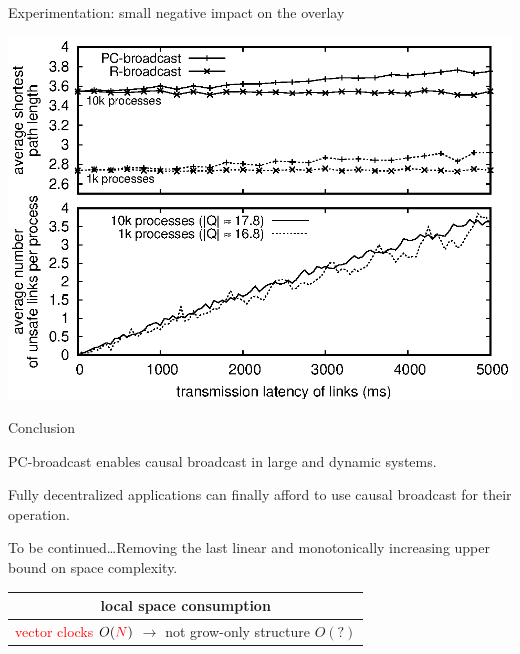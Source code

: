 \documentclass[10pt, xcolor={usenames, dvipsnames}]{beamer}
\newcommand{\NO}[1]{\textcolor{red}{#1}}
\begin{document}
\begin{frame}{Experimentation: small negative impact on the overlay}

  \begin{center}
    \includegraphics[width=1\textwidth]{img/delay.eps}
  \end{center}

\end{frame}

\begin{frame}{Conclusion}
  
  PC-broadcast enables causal broadcast in large and dynamic systems. 
  
  \vspace{1em}

  Fully decentralized applications can finally afford to use causal broadcast
  for their operation. 


  \begin{table}
    
  \end{table}


\end{frame}

\begin{frame}[standout]
  To be continued\ldots Removing the last linear and monotonically increasing upper bound on space complexity.
  
  \vspace{2em}
  
  \small 
  \begin{table}
    \begin{tabularx}{0.67\columnwidth}{@{}c@{}}
      local space consumption \\
      \hline\hline
      \NO{vector clocks} $O(\NO{N})$ $\rightarrow$ not grow-only structure $O(?)$
    \end{tabularx}
  \end{table}
  
\end{frame}
\end{document}
